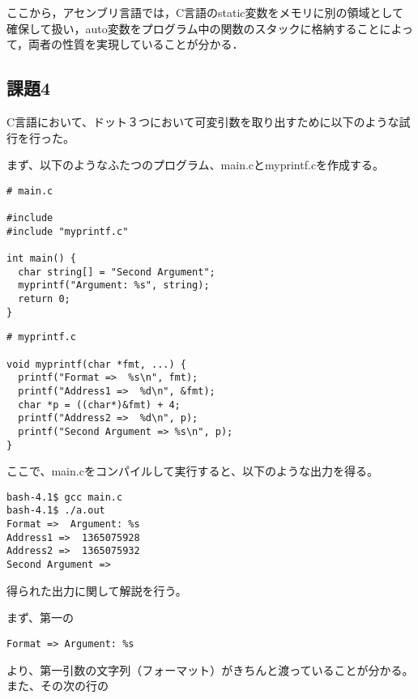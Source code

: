 \documentclass[a4j]{jarticle}
\begin{document}
ここから，アセンブリ言語では，C言語のstatic変数をメモリに別の領域として確保して扱い，auto変数をプログラム中の関数のスタックに格納することによって，両者の性質を実現していることが分かる．



\subsection{課題4}


C言語において、ドット３つにおいて可変引数を取り出すために以下のような試行を行った。

まず、以下のようなふたつのプログラム、main.cとmyprintf.cを作成する。

\begin{verbatim}
# main.c

#include
#include "myprintf.c"
 
int main() {
  char string[] = "Second Argument";
  myprintf("Argument: %s", string);
  return 0;
}
\end{verbatim}

\begin{verbatim}
# myprintf.c

void myprintf(char *fmt, ...) {
  printf("Format =>  %s\n", fmt);
  printf("Address1 =>  %d\n", &fmt);
  char *p = ((char*)&fmt) + 4;
  printf("Address2 =>  %d\n", p);
  printf("Second Argument => %s\n", p);
}

\end{verbatim}

ここで、main.cをコンパイルして実行すると、以下のような出力を得る。

\begin{verbatim}
bash-4.1$ gcc main.c 
bash-4.1$ ./a.out 
Format =>  Argument: %s
Address1 =>  1365075928
Address2 =>  1365075932
Second Argument => 
\end{verbatim}

得られた出力に関して解説を行う。

まず、第一の

\begin{verbatim}
Format => Argument: %s
\end{verbatim}

より、第一引数の文字列（フォーマット）がきちんと渡っていることが分かる。また、その次の行の
\end{document}

